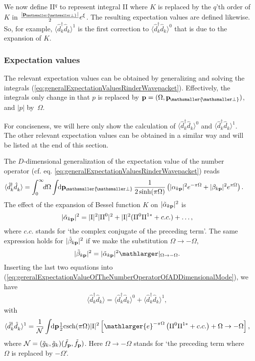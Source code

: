 \documentclass[11pt, a4paper]{article}
\def\bp{{\bf p}}
\newcommand{\Om}{\Omega}
\newcommand{\be}{\beta}
\newcommand{\al}{\alpha}
\newcommand{\mc}[1]{\mathcal{#1}}
\newcommand{\sfrac}[2]{{\textstyle\frac{#1}{#2}}}
\newcommand{\half}{\sfrac{1}{2}}
\newcommand{\integral}{\int\!\! \mathrm{d}}
\newcommand{\csch}{\mathrm{csch}}
\let\perptmp\perp
\renewcommand{\perp}{{\! \mathsmaller{\perptmp}}}
\newcommand{\e}{\mathlarger{e}}
\newcommand{\mrm}{\mathrm}
\newcommand{\nodagger}{{\phantom{\dagger}}}
\newcommand{\ddd}{\langle \hat d_k^\dagger \hat d^\nodagger_k \rangle}
\begin{document}
We now define II$^q$ to  represent integral II where $K$ is replaced by the $q$'th order of $K$ in $\frac{|\bp_\perp|}{2}e^{\xi}$. The resulting expectation values are defined likewise. So, for example, $\ddd^1$ is the first correction to $\ddd^0$ that is due to the expansion of $K$.

\subsubsection{Expectation values}\label{sec:calcExValDDimensionalRindlerWavepakets}
The relevant expectation values can be obtained by generalizing and solving the integrals (\ref{eq:generalExpectationValuesRinderWavepacket}).  Effectively, the  integrals only change in that $p$ is replaced by $\bp=(\Om,\bp_\perp)$, and $|p|$ by~$\Om$. 

For conciseness, we will here only show the calculation of $\ddd^0$ and $\ddd^1$. The other relevant expectation values can be obtained in a similar way and will be listed at the end of this section. 

The $D$-dimensional generalization of the expectation value of the number operator (cf. eq. \ref{eq:generalExpectationValuesRinderWavepacket}) reads 
\begin{align}
\label{eq:gereralExpectationValueOfTheNumberOperatorOfADDimensionalMode}
\ddd  &=\int_0^\infty \mathrm\!\! d\Om \integral \bp_\perp\,\frac{1}{2\sinh(\pi\Om )}\left(|\al_{k\bp}|^2e^{-\pi\Om  }+|\be_{k\bp}|^2e^{\pi\Om }\right).
\end{align}
 The effect of the expansion of Bessel function $K$ on $|\tilde\al_{k\bp}|^2$ is
\begin{align*}
|\tilde\al_{k\bp}|^2=|\mrm I|^2|\mrm{II}^0|^2+|\mrm I|^2(\mrm{II}^0\mrm{II}^{1*}+c.c.)+\ldots,
\end{align*}
where $c.c.$ stands for `the complex conjugate of the preceding term'.
The  same expression holds for  $|\tilde\be_{k\bp}|^2$ if we  make the substitution $\Om\to -\Om$,
\begin{align*}
|\tilde\be_{k\bp}|^2=|\tilde\al_{k\bp}|^2\mathlarger|_{\Om\to-\Om}.
\end{align*}
Inserting the last two equations into (\ref{eq:gereralExpectationValueOfTheNumberOperatorOfADDimensionalMode}), we have
\begin{align*}
\ddd=\ddd^0+\ddd^1,
\end{align*}
with
\begin{align}
\label{eq:calcCorrectionToN}
\ddd^1=\frac{1}{\mc N}\integral \bp \half \csch(\pi\Om)|\mathrm I|^2\left[\e^{-\pi\Om}\left(\mathrm{II}^0\mathrm{II}^{1*}+c.c.\right)+\Om\to-\Om\right],
\end{align}
where $\mc N=(\tilde g_k,\tilde g_k)(\tilde f_\bp,\tilde f_\bp)$. Here $\Om\to-\Om$ stands for `the preceding term where $\Om$ is replaced by $-\Om$'.
\end{document}
